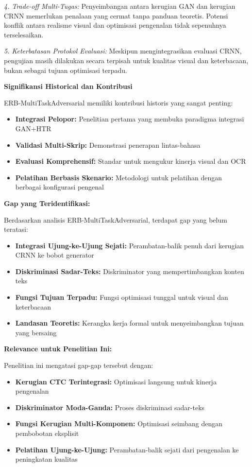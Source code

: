\documentclass[12pt,a4paper]{article}
\begin{document}
\textit{4. Trade-off Multi-Tugas:}
Penyeimbangan antara kerugian GAN dan kerugian CRNN memerlukan penalaan yang cermat tanpa panduan teoretis. Potensi konflik antara realisme visual dan optimisasi pengenalan tidak sepenuhnya terselesaikan.

\textit{5. Keterbatasan Protokol Evaluasi:}
Meskipun mengintegrasikan evaluasi CRNN, pengujian masih dilakukan secara terpisah untuk kualitas visual dan keterbacaan, bukan sebagai tujuan optimisasi terpadu.

\textbf{Signifikansi Historical dan Kontribusi}

ERB-MultiTaskAdversarial memiliki kontribusi historis yang sangat penting:

\begin{itemize}
    \item \textbf{Integrasi Pelopor:} Penelitian pertama yang membuka paradigma integrasi GAN+HTR
    \item \textbf{Validasi Multi-Skrip:} Demonstrasi penerapan lintas-bahasa
    \item \textbf{Evaluasi Komprehensif:} Standar untuk mengukur kinerja visual dan OCR
    \item \textbf{Pelatihan Berbasis Skenario:} Metodologi untuk pelatihan dengan berbagai konfigurasi pengenal
\end{itemize}

\textbf{Gap yang Teridentifikasi:}

Berdasarkan analisis ERB-MultiTaskAdversarial, terdapat gap yang belum teratasi:

\begin{itemize}
    \item \textbf{Integrasi Ujung-ke-Ujung Sejati:} Perambatan-balik penuh dari kerugian CRNN ke bobot generator
    \item \textbf{Diskriminasi Sadar-Teks:} Diskriminator yang mempertimbangkan konten teks
    \item \textbf{Fungsi Tujuan Terpadu:} Fungsi optimisasi tunggal untuk visual dan keterbacaan
    \item \textbf{Landasan Teoretis:} Kerangka kerja formal untuk menyeimbangkan tujuan yang bersaing
\end{itemize}

\textbf{Relevance untuk Penelitian Ini:}

Penelitian ini mengatasi gap-gap tersebut dengan:
\begin{itemize}
    \item \textbf{Kerugian CTC Terintegrasi:} Optimisasi langsung untuk kinerja pengenalan
    \item \textbf{Diskriminator Moda-Ganda:} Proses diskriminasi sadar-teks
    \item \textbf{Fungsi Kerugian Multi-Komponen:} Optimisasi seimbang dengan pembobotan eksplisit
    \item \textbf{Pelatihan Ujung-ke-Ujung:} Perambatan-balik sejati dari pengenalan ke peningkatan kualitas
\end{itemize}
\end{document}
